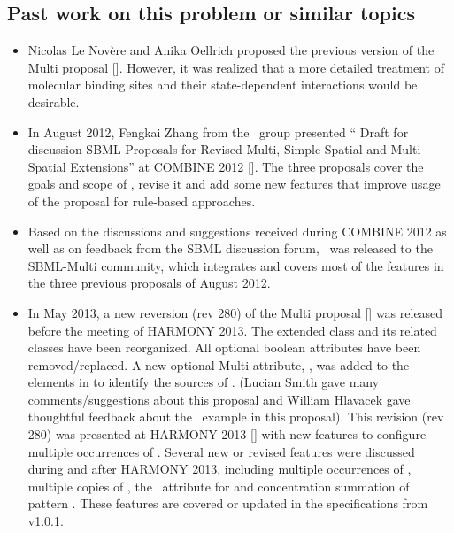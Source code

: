 \subsection{Past work on this problem or similar topics}
\label{def:Past_work}

\begin{itemize}
 \item 
  Nicolas Le Nov\`ere and Anika Oellrich proposed the previous version of the Multi proposal [\cite{ref:multi1}]. However, it was realized that a more detailed treatment of molecular binding sites and their state-dependent interactions would be desirable.
 
 \item In August 2012, Fengkai Zhang from the \Simmune\ group presented `` Draft for discussion SBML Proposals for Revised Multi, Simple Spatial and Multi-Spatial Extensions'' at COMBINE 2012 [\cite{ref:revisedMulti}]. The three proposals cover the goals and scope of \multiOneProposal, revise it and add some new features that improve usage of the proposal for rule-based approaches.
 
 \item Based on the discussions and suggestions received during COMBINE 2012 as well as on feedback from the SBML discussion forum, \multiTwoProposalVerTwo\ was released to the SBML-Multi community, which integrates and covers most of the features in the three previous proposals of August 2012. 
 
 \item In May 2013, a new reversion (rev 280) of the Multi proposal [\cite{ref:multiproposal280}] was released before the meeting of HARMONY 2013. The extended \ExCompartment class and its related classes have been reorganized. All optional boolean attributes have been removed/replaced. A new optional Multi attribute, , was added to the  elements in  to identify  the sources of \species. (Lucian Smith gave many comments/suggestions about this proposal and William Hlavacek gave thoughtful feedback about the \BioNetGen\ example in this proposal). This revision (rev 280) was presented at HARMONY 2013  [\cite{ref:harmony2013}] with new features to configure multiple occurrences of \SpeciesFeatureType. Several new or revised features were discussed during and after HARMONY 2013, including multiple occurrences of \SpeciesFeatureType, multiple copies of \SpeciesTypeInstance, the \numericValueAtt\ attribute for \PossibleSpeciesFeatureValue and concentration summation of pattern \species. These features are covered or updated in the specifications from v1.0.1.
  
\end{itemize}


